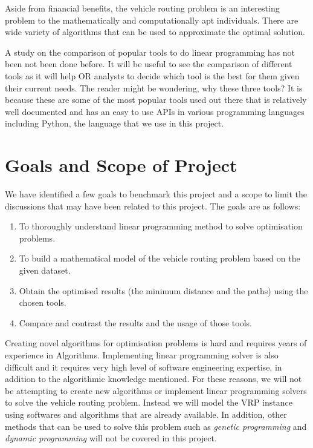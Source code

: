\documentclass[a4paper, 12pt]{report}
\begin{document}
Aside from financial benefits, the vehicle routing problem is an interesting problem to the mathematically and computationally apt individuals.
There are wide variety of algorithms that can be used to approximate the optimal solution.

A study on the comparison of popular tools to do linear programming has not been not been done before. It will be useful to see the comparison
of different tools as it will help OR analysts to decide which tool is the best for them given their current needs. The reader might be
wondering, why these three tools? It is because these are some of the most popular tools used out there that is relatively well documented and
has an easy to use APIs in various programming languages including Python, the language that we use in this project.

\section{Goals and Scope of Project}
We have identified a few goals to benchmark this project and a scope to limit the discussions that may have been related to this project. The goals are as
follows:
\begin{enumerate}
\item To thoroughly understand linear programming method to solve optimisation problems.
\item To build a mathematical model of the vehicle routing problem based on the given dataset.
\item Obtain the optimised results (the minimum distance and the paths) using the chosen tools.
\item Compare and contrast the results and the usage of those tools.
\end{enumerate}

Creating novel algorithms for optimisation problems is hard and requires years of experience in Algorithms.
Implementing linear programming solver is also difficult and it requires very high level of software engineering expertise, in addition to
the algorithmic knowledge mentioned. For these reasons, we will not be attempting to create new algorithms or implement linear programming solvers to solve
the vehicle routing problem. Instead we will model the VRP instance using softwares and algorithms that are already available.
In addition, other methods that can be used to solve this problem such as \textit{genetic programming} and \textit{dynamic programming} will
not be covered in this project.
\end{document}
